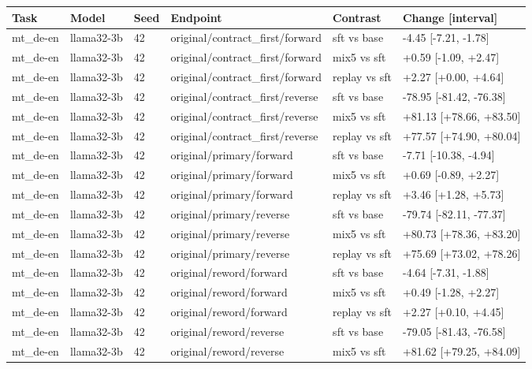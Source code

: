 \begin{table}[t]
\centering\small
\begin{tabular}{llllll}
\toprule
Task & Model & Seed & Endpoint & Contrast & Change [interval] \\
\midrule
mt\_de-en & llama32-3b & 42 & original/contract\_first/forward & sft vs base & -4.45 [-7.21, -1.78] \\
mt\_de-en & llama32-3b & 42 & original/contract\_first/forward & mix5 vs sft & +0.59 [-1.09, +2.47] \\
mt\_de-en & llama32-3b & 42 & original/contract\_first/forward & replay vs sft & +2.27 [+0.00, +4.64] \\
mt\_de-en & llama32-3b & 42 & original/contract\_first/reverse & sft vs base & -78.95 [-81.42, -76.38] \\
mt\_de-en & llama32-3b & 42 & original/contract\_first/reverse & mix5 vs sft & +81.13 [+78.66, +83.50] \\
mt\_de-en & llama32-3b & 42 & original/contract\_first/reverse & replay vs sft & +77.57 [+74.90, +80.04] \\
mt\_de-en & llama32-3b & 42 & original/primary/forward & sft vs base & -7.71 [-10.38, -4.94] \\
mt\_de-en & llama32-3b & 42 & original/primary/forward & mix5 vs sft & +0.69 [-0.89, +2.27] \\
mt\_de-en & llama32-3b & 42 & original/primary/forward & replay vs sft & +3.46 [+1.28, +5.73] \\
mt\_de-en & llama32-3b & 42 & original/primary/reverse & sft vs base & -79.74 [-82.11, -77.37] \\
mt\_de-en & llama32-3b & 42 & original/primary/reverse & mix5 vs sft & +80.73 [+78.36, +83.20] \\
mt\_de-en & llama32-3b & 42 & original/primary/reverse & replay vs sft & +75.69 [+73.02, +78.26] \\
mt\_de-en & llama32-3b & 42 & original/reword/forward & sft vs base & -4.64 [-7.31, -1.88] \\
mt\_de-en & llama32-3b & 42 & original/reword/forward & mix5 vs sft & +0.49 [-1.28, +2.27] \\
mt\_de-en & llama32-3b & 42 & original/reword/forward & replay vs sft & +2.27 [+0.10, +4.45] \\
mt\_de-en & llama32-3b & 42 & original/reword/reverse & sft vs base & -79.05 [-81.43, -76.58] \\
mt\_de-en & llama32-3b & 42 & original/reword/reverse & mix5 vs sft & +81.62 [+79.25, +84.09] \\

\end{tabular}
\end{table}

